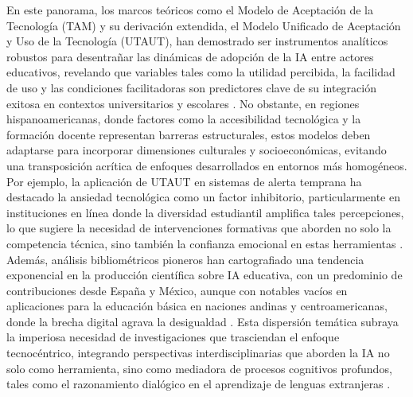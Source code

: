 \documentclass[spanish]{textolivre}
\begin{document}
En este panorama, los marcos teóricos como el Modelo de Aceptación de la Tecnología (TAM) y su derivación extendida, el Modelo Unificado de Aceptación y Uso de la Tecnología (UTAUT), han demostrado ser instrumentos analíticos robustos para desentrañar las dinámicas de adopción de la IA entre actores educativos, revelando que variables tales como la utilidad percibida, la facilidad de uso y las condiciones facilitadoras son predictores clave de su integración exitosa en contextos universitarios y escolares \cite{chocarro2023, raffaghelli2022}. No obstante, en regiones hispanoamericanas, donde factores como la accesibilidad tecnológica y la formación docente representan barreras estructurales, estos modelos deben adaptarse para incorporar dimensiones culturales y socioeconómicas, evitando una transposición acrítica de enfoques desarrollados en entornos más homogéneos. Por ejemplo, la aplicación de UTAUT en sistemas de alerta temprana ha destacado la ansiedad tecnológica como un factor inhibitorio, particularmente en instituciones en línea donde la diversidad estudiantil amplifica tales percepciones, lo que sugiere la necesidad de intervenciones formativas que aborden no solo la competencia técnica, sino también la confianza emocional en estas herramientas \cite{raffaghelli2022}. Además, análisis bibliométricos pioneros han cartografiado una tendencia exponencial en la producción científica sobre IA educativa, con un predominio de contribuciones desde España y México, aunque con notables vacíos en aplicaciones para la educación básica en naciones andinas y centroamericanas, donde la brecha digital agrava la desigualdad \cite{hinojolucena2019, forerocorba2024}. Esta dispersión temática subraya la imperiosa necesidad de investigaciones que trasciendan el enfoque tecnocéntrico, integrando perspectivas interdisciplinarias que aborden la IA no solo como herramienta, sino como mediadora de procesos cognitivos profundos, tales como el razonamiento dialógico en el aprendizaje de lenguas extranjeras \cite{bibauw2019}.
\end{document}
